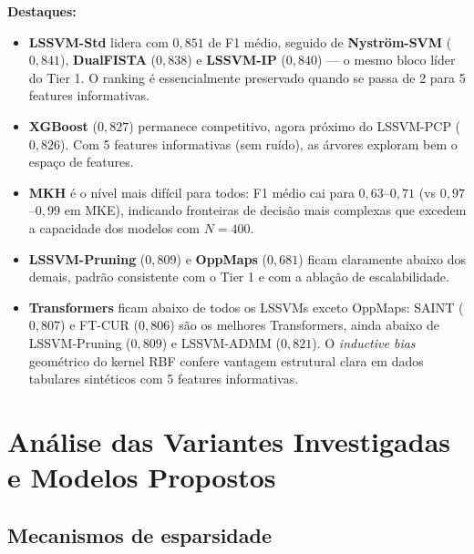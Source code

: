 \documentclass[12pt,a4paper]{article}
\begin{document}


\textbf{Destaques:}
\begin{itemize}
  \item \textbf{LSSVM-Std} lidera com $0{,}851$ de F1 médio, seguido de
        \textbf{Nyström-SVM} ($0{,}841$), \textbf{DualFISTA} ($0{,}838$) e
        \textbf{LSSVM-IP} ($0{,}840$) --- o mesmo bloco líder do Tier 1.
        O ranking é essencialmente preservado quando se passa de 2 para 5
        features informativas.
  \item \textbf{XGBoost} ($0{,}827$) permanece competitivo, agora próximo do
        LSSVM-PCP ($0{,}826$). Com 5 features informativas (sem ruído), as
        árvores exploram bem o espaço de features.
  \item \textbf{MKH} é o nível mais difícil para todos: F1 médio cai para
        $0{,}63$--$0{,}71$ (vs $0{,}97$--$0{,}99$ em MKE), indicando fronteiras
        de decisão mais complexas que excedem a capacidade dos modelos com $N=400$.
  \item \textbf{LSSVM-Pruning} ($0{,}809$) e \textbf{OppMaps} ($0{,}681$) ficam
        claramente abaixo dos demais, padrão consistente com o Tier 1 e com a
        ablação de escalabilidade.
  \item \textbf{Transformers} ficam abaixo de todos os LSSVMs exceto OppMaps:
        SAINT ($0{,}807$) e FT-CUR ($0{,}806$) são os melhores Transformers,
        ainda abaixo de LSSVM-Pruning ($0{,}809$) e LSSVM-ADMM ($0{,}821$).
        O \emph{inductive bias} geométrico do kernel RBF confere vantagem
        estrutural clara em dados tabulares sintéticos com 5 features
        informativas.
\end{itemize}

\section{Análise das Variantes Investigadas e Modelos Propostos}
\label{sec:proposed}

\subsection{Mecanismos de esparsidade}
\end{document}

